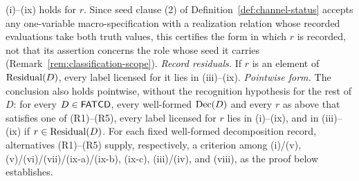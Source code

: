 \begin{theorem}
(i)--(ix) holds for \(r\). Since seed clause (2) of
Definition~\ref{def:channel-status} accepts any one-variable macro-specification with a realization relation
whose recorded evaluations take both truth values, this certifies the form in
which \(r\) is recorded, not that its assertion concerns the role whose seed it
carries (Remark~\ref{rem:classification-scope}). \emph{Record residuals.} If \(r\) is an element of \(\operatorname{Residual}\!\left(D\right)\), every label licensed for it
lies in (iii)--(ix). \emph{Pointwise form.} The conclusion also holds pointwise, without the
recognition hypothesis for the rest of \(D\): for every \(D\in\mathsf{FATCD}{}\), every
well-formed \(\operatorname{Dec}\!\left(D\right)\) and every \(r\) as above that satisfies one of
(R1)--(R5), every label licensed for \(r\) lies in (i)--(ix), and in
(iii)--(ix) if \(r\in\operatorname{Residual}\!\left(D\right)\). For each fixed well-formed decomposition
record, alternatives (R1)--(R5) supply, respectively, a criterion among
(i)/(v), (v)/(vi)/(vii)/(ix-a)/(ix-b), (ix-c), (iii)/(iv), and (viii), as the
proof below establishes.
\end{theorem}

